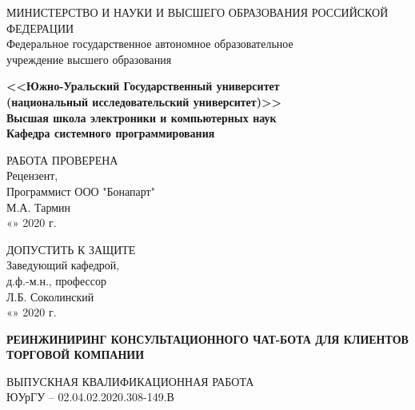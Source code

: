 \begin{titlepage}
    \begin{center}
        МИНИСТЕРСТВО И НАУКИ И ВЫСШЕГО ОБРАЗОВАНИЯ РОССИЙСКОЙ ФЕДЕРАЦИИ\\
        Федеральное государственное автономное образовательное\\
        учреждение высшего образования

        \textbf{
        <<Южно-Уральский Государственный университет\\
        (национальный исследовательский университет)>>\\
        Высшая школа электроники и компьютерных наук\\
        Кафедра системного программирования
        }
        \bigskip
        
        \noindent
        \newline
        \begin{minipage}{0.5\textwidth}
            РАБОТА ПРОВЕРЕНА\\
            Рецензент,\\
            Программист ООО "Бонапарт"\\
            \underline{\hspace{2cm}} М.А. Тармин\\
            «\underline{\hspace{0.7cm}}» \underline{\hspace{2cm}} 2020 г.
        \end{minipage}
        \vspace{\fill}
        \begin{minipage}{0.4\textwidth}
            ДОПУСТИТЬ К ЗАЩИТЕ\\
            Заведующий кафедрой,\\
            д.ф.-м.н., профессор\\
            \underline{\hspace{2cm}} Л.Б. Соколинский\\
            «\underline{\hspace{0.7cm}}» \underline{\hspace{2cm}} 2020 г.
        \end{minipage}

        \vfill
        \large\textbf{
            РЕИНЖИНИРИНГ КОНСУЛЬТАЦИОННОГО ЧАТ-БОТА ДЛЯ КЛИЕНТОВ ТОРГОВОЙ КОМПАНИИ
        }        
        \bigskip
        
        ВЫПУСКНАЯ КВАЛИФИКАЦИОННАЯ РАБОТА\\
        ЮУрГУ – 02.04.02.2020.308-149.В
    \end{center}
    \vfill


\end{titlepage}
